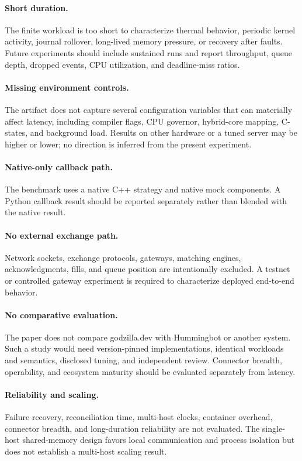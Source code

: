 \documentclass[11pt]{article}
\newcommand{\framework}{godzilla.dev}
\begin{document}
\paragraph{Short duration.}
The finite workload is too short to characterize thermal behavior, periodic kernel activity, journal rollover, long-lived memory pressure, or recovery after faults. Future experiments should include sustained runs and report throughput, queue depth, dropped events, CPU utilization, and deadline-miss ratios.

\paragraph{Missing environment controls.}
The artifact does not capture several configuration variables that can materially affect latency, including compiler flags, CPU governor, hybrid-core mapping, C-states, and background load. Results on other hardware or a tuned server may be higher or lower; no direction is inferred from the present experiment.

\paragraph{Native-only callback path.}
The benchmark uses a native C++ strategy and native mock components. A Python callback result should be reported separately rather than blended with the native result.

\paragraph{No external exchange path.}
Network sockets, exchange protocols, gateways, matching engines, acknowledgments, fills, and queue position are intentionally excluded. A testnet or controlled gateway experiment is required to characterize deployed end-to-end behavior.

\paragraph{No comparative evaluation.}
The paper does not compare \framework{} with Hummingbot or another system. Such a study would need version-pinned implementations, identical workloads and semantics, disclosed tuning, and independent review. Connector breadth, operability, and ecosystem maturity should be evaluated separately from latency.

\paragraph{Reliability and scaling.}
Failure recovery, reconciliation time, multi-host clocks, container overhead, connector breadth, and long-duration reliability are not evaluated. The single-host shared-memory design favors local communication and process isolation but does not establish a multi-host scaling result.
\end{document}

